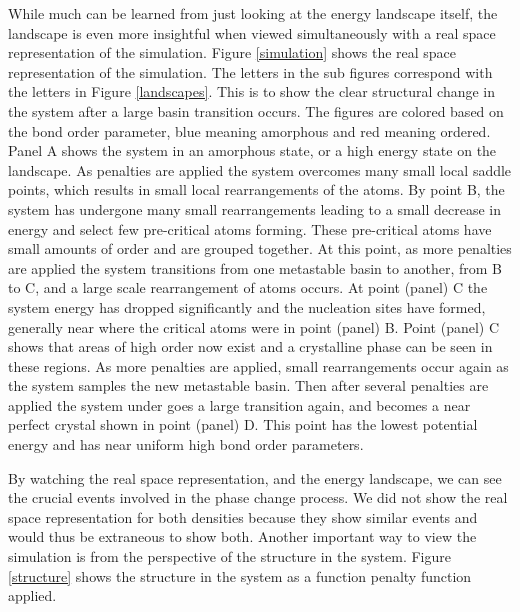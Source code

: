 While much can be learned from just looking at the energy landscape itself, the landscape is even more insightful when viewed simultaneously with a real space representation of the simulation.  Figure \ref{simulation} shows the real space representation of the simulation.  The letters in the sub figures correspond with the letters in Figure \ref{landscapes}.  This is to show the clear structural change in the system after a large basin transition occurs.  The figures are colored based on the bond order parameter, blue meaning amorphous and red meaning ordered.  Panel A shows the system in an amorphous state, or a high energy state on the landscape.  As penalties are applied the system overcomes many small local saddle points, which results in small local rearrangements of the atoms.  By point B, the system has undergone many small rearrangements leading to a small decrease in energy and select few pre-critical atoms forming.  These pre-critical atoms have small amounts of order and are grouped together.  At this point, as more penalties are applied the system transitions from one metastable basin to another, from B to C, and a large scale rearrangement of atoms occurs.  At point (panel) C the system energy has dropped significantly and the nucleation sites have formed, generally near where the critical atoms were in point (panel) B.  Point (panel) C shows that areas of high order now exist and a crystalline phase can be seen in these regions.  As more penalties are applied, small rearrangements occur again as the system samples the new metastable basin.  Then after several penalties are applied the system under goes a large transition again, and becomes a near perfect crystal shown in point (panel) D.  This point has the lowest potential energy and has near uniform high bond order parameters.

By watching the real space representation, and the energy landscape, we can see the crucial events involved in the phase change process.  We did not show the real space representation for both densities because they show similar events and would thus be extraneous to show both.  Another important way to view the simulation is from the perspective of the structure in the system.  Figure \ref{structure} shows the structure in the system as a function penalty function applied.

